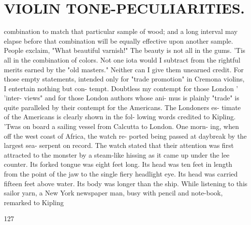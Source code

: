 \documentclass{article}
\begin{document}
\section*{VIOLIN TONE-PECULIARITIES.}
combination to match that particular sample of wood; and a long interval may elapse before that combination will be equally effective upon another sample. People exclaim, "What beautiful varnish!" The beauty is not all in the gums. 'Tis all in the combination of colors. Not one iota would I subtract from the rightful merits earned by the "old masters." Neither can I give them unearned credit. For those empty statements, intended only for "trade promotion" in Cremona violins, I entertain nothing but con- tempt. Doubtless my contempt for those London ' 'inter- views" and for those London authors whose ani- mus is plainly "trade" is quite paralleled by their contempt for the Americans. The Londoners es- timate of the Americans is clearly shown in the fol- lowing words credited to Kipling. 'Twas on board a sailing vessel from Calcutta to London. One morn- ing, when off the west coast of Africa, the watch re- ported being passed at daybreak by the largest sea- serpent on record. The watch stated that their attention was first attracted to the monster by a steam-like hissing as it came up under the lee counter. Its forked tongue was eight feet long. Its head was ten feet in length from the point of the jaw to the single fiery headlight eye. Its head was carried fifteen feet above water. Its body was longer than the ship. While listening to this sailor yarn, a New York newspaper man, busy with pencil and note-book, remarked to Kipling

127
\end{document}

